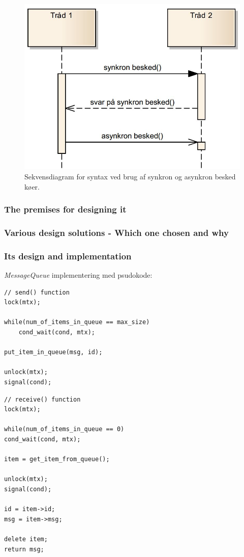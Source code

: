 \begin{figure}[h]
	\centering
	\includegraphics[width=0.6\linewidth]{figs/spm3/msq_seqdia}
	\caption[Syntax for sekvensdiagram med syn -og asynkron msq.]{Sekvensdiagram for syntax ved brug af synkron og asynkron besked køer.}
	\label{fig:msq_seqdia}
\end{figure}

\subsubsection{The premises for designing it}

\subsubsection{Various design solutions - Which one chosen and why}

\subsubsection{Its design and implementation}
\textit{MessageQueue} implementering med psudokode:

\begin{lstlisting}[otherkeywords={un, lock, signal, cond_wait}]
// send() function
lock(mtx);

while(num_of_items_in_queue == max_size)
	cond_wait(cond, mtx);
	
put_item_in_queue(msg, id);

unlock(mtx);
signal(cond);
\end{lstlisting}

\begin{lstlisting}
// receive() function
lock(mtx);

while(num_of_items_in_queue == 0)
cond_wait(cond, mtx);

item = get_item_from_queue();

unlock(mtx);
signal(cond);

id = item->id;
msg = item->msg;

delete item;
return msg;
\end{lstlisting}

